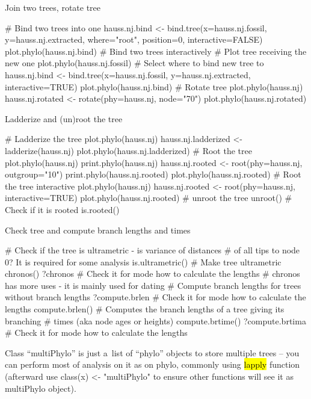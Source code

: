\documentclass[compress, ucs, xelatex, 11pt, xcolor=svgnames,
  hyperref={
    bookmarks=true,
    unicode=true,
    colorlinks=true,
    pdftitle={Molecular data in R},
    plainpages=false,
    pdfauthor={Vojtech Zeisek},
    pdfsubject={Course about phylogeny and evolution in R},
    pdfcreator={XeLaTeX},
    pdfkeywords={R, evolution, phylogeny, molecular data},
    linkcolor=Tomato,
    anchorcolor=SaddleBrown,
    citecolor=Goldenrod,
    filecolor=DarkMagenta,
    menucolor=Sienna,
    urlcolor=DarkTurquoise,
    pdftex},
  url={hyphens, lowtilde} %
  ]{beamer}
\renewcommand{\texttt}[1]{\hl{\ttfamily #1}}
\begin{document}
\begin{frame}[fragile]{Join two trees, rotate tree}
  \begin{spluscode}
    # Bind two trees into one
    hauss.nj.bind <- bind.tree(x=hauss.nj.fossil, y=hauss.nj.extracted,
      where="root", position=0, interactive=FALSE)
    plot.phylo(hauss.nj.bind)
    # Bind two trees interactively
    # Plot tree receiving the new one
    plot.phylo(hauss.nj.fossil)
    # Select where to bind new tree to
    hauss.nj.bind <- bind.tree(x=hauss.nj.fossil, y=hauss.nj.extracted,
      interactive=TRUE)
    plot.phylo(hauss.nj.bind)
    # Rotate tree
    plot.phylo(hauss.nj)
    hauss.nj.rotated <- rotate(phy=hauss.nj, node="70")
    plot.phylo(hauss.nj.rotated)
  \end{spluscode}
\end{frame}

\begin{frame}[fragile]{Ladderize and (un)root the tree}
  \begin{spluscode}
    # Ladderize the tree
    plot.phylo(hauss.nj)
    hauss.nj.ladderized <- ladderize(hauss.nj)
    plot.phylo(hauss.nj.ladderized)
    # Root the tree
    plot.phylo(hauss.nj)
    print.phylo(hauss.nj)
    hauss.nj.rooted <- root(phy=hauss.nj, outgroup="10")
    print.phylo(hauss.nj.rooted)
    plot.phylo(hauss.nj.rooted)
    # Root the tree interactive
    plot.phylo(hauss.nj)
    hauss.nj.rooted <- root(phy=hauss.nj, interactive=TRUE)
    plot.phylo(hauss.nj.rooted)
    # unroot the tree
    unroot()
    # Check if it is rooted
    is.rooted()
  \end{spluscode}
\end{frame}

\begin{frame}[fragile]{Check tree and compute branch lengths and times}
  \begin{spluscode}
    # Check if the tree is ultrametric - is variance of distances
    # of all tips to node 0? It is required for some analysis
    is.ultrametric()
    # Make tree ultrametric
    chronos()
    ?chronos # Check it for mode how to calculate the lengths
    # chronos has more uses - it is mainly used for dating
    # Compute branch lengths for trees without branch lengths
    ?compute.brlen # Check it for mode how to calculate the lengths
    compute.brlen()
    # Computes the branch lengths of a tree giving its branching
    # times (aka node ages or heights)
    compute.brtime()
    ?compute.brtima # Check it for mode how to calculate the lengths
  \end{spluscode}
Class ``multiPhylo'' is just a~list of ``phylo'' objects to store multiple trees -- you can perform most of analysis on it as on phylo, commonly using \texttt{lapply} function (afterward use class(x) <- "multiPhylo" to ensure other functions will see it as multiPhylo object).
\end{frame}
\end{document}
